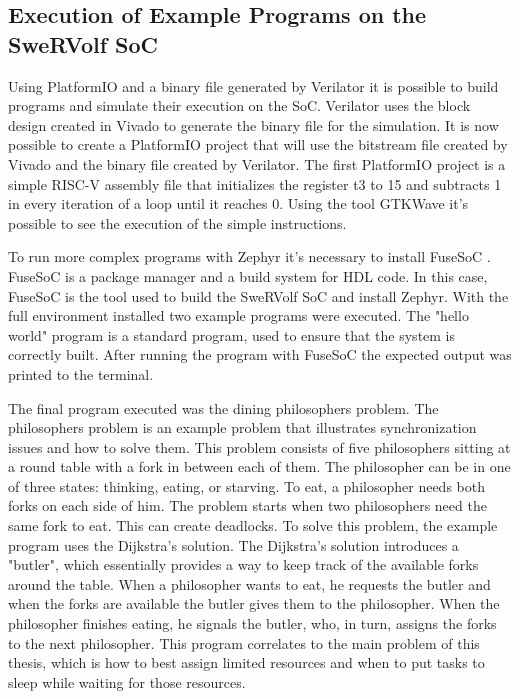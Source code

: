 \subsection{Execution of Example Programs on the SweRVolf SoC}
Using PlatformIO \cite{platformio} and a binary file generated by Verilator \cite{Verilator} it is possible to build programs and simulate their execution on the SoC. Verilator uses the block design created in Vivado to generate the binary file for the simulation. It is now possible to create a PlatformIO project that will use the bitstream file created by Vivado and the binary file created by Verilator. The first PlatformIO project is a simple RISC-V assembly file that initializes the register t3 to 15 and subtracts 1 in every iteration of a loop until it reaches 0. Using the tool GTKWave it's possible to see the execution of the simple instructions. 

To run more complex programs with Zephyr it's necessary to install FuseSoC \cite{fusesoc}. FuseSoC is a package manager and a build system for HDL code. In this case, FuseSoC is the tool used to build the SweRVolf SoC and install Zephyr. With the full environment installed two example programs were executed. The "hello world" program is a standard program, used to ensure that the system is correctly built. After running the program with FuseSoC the expected output was printed to the terminal. 

The final program executed was the dining philosophers problem. The philosophers problem is an example problem that illustrates synchronization issues and how to solve them. This problem consists of five philosophers sitting at a round table with a fork in between each of them. The philosopher can be in one of three states: thinking, eating, or starving. To eat, a philosopher needs both forks on each side of him. The problem starts when two philosophers need the same fork to eat. This can create deadlocks. To solve this problem, the example program uses the Dijkstra's solution. The Dijkstra's solution introduces a "butler", which essentially provides a way to keep track of the available forks around the table. When a philosopher wants to eat, he requests the butler and when the forks are available the butler gives them to the philosopher. When the philosopher finishes eating, he signals the butler, who, in turn, assigns the forks to the next philosopher. This program correlates to the main problem of this thesis, which is how to best assign limited resources and when to put tasks to sleep while waiting for those resources.

